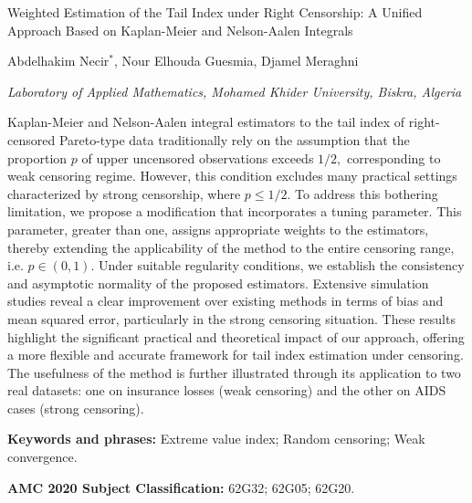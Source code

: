 \documentclass[reqno,openbib,runningheads,a4paper,12pt]{amsart}%
\begin{document}
\begin{center}
{\large Weighted Estimation of the Tail Index under Right Censorship: A
Unified Approach Based on Kaplan-Meier and Nelson-Aalen Integrals}

{\Large \textbf{ }}\bigskip

{\large Abdelhakim Necir}$^{\ast}${\large , Nour Elhouda Guesmia, Djamel
Meraghni}\medskip\newline

{\small \textit{Laboratory of Applied Mathematics, Mohamed Khider University,
Biskra, Algeria}}\medskip\medskip
\end{center}

\noindent Kaplan-Meier and Nelson-Aalen integral estimators to the tail index
of right-censored Pareto-type data traditionally rely on the assumption that
the proportion $p$ of upper uncensored observations exceeds $1/2,$
corresponding to weak censoring regime. However, this condition excludes many
practical settings characterized by strong censorship, where $p\leq1/2.$ To
address this bothering limitation, we propose a modification that incorporates
a tuning parameter. This parameter, greater than one, assigns appropriate
weights to the estimators, thereby extending the applicability of the method
to the entire censoring range, i.e. $p\in\left(  0,1\right)  .$ Under suitable
regularity conditions, we establish the consistency and asymptotic normality
of the proposed estimators. Extensive simulation studies reveal a clear
improvement over existing methods in terms of bias and mean squared error,
particularly in the strong censoring situation. These results highlight the
significant practical and theoretical impact of our approach, offering a more
flexible and accurate framework for tail index estimation under censoring. The
usefulness of the method is further illustrated through its application to two
real datasets: one on insurance losses (weak censoring) and the other on AIDS
cases (strong censoring).\bigskip

\noindent\textbf{Keywords and phrases:} Extreme value index; Random censoring;
Weak convergence.\medskip

\noindent\textbf{AMC 2020 Subject Classification:} 62G32; 62G05; 62G20.

\vfill


\vfill


\newline
\end{document}
